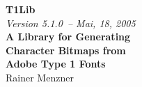 \documentclass[11pt,a4paper]{article}
\def\libversion{5.1.0}\relax
\def\libdate{Mai, 18, 2005}\relax
\begin{document}
\thispagestyle{empty}
\begin{center}
\leavevmode
\vskip2cm
{\Huge\bfseries T1Lib}\\[5mm]

{\Large\sl Version \libversion\ --  \libdate}\\[2.5cm]

{\LARGE\bf A Library for Generating}\\[5mm]
{\LARGE\bf Character Bitmaps from}\\[5mm]
{\LARGE\bf Adobe Type 1 Fonts}\\[2cm]
{\Large\sc Rainer Menzner}\\[2mm]
\end{center}
\newpage
\tableofcontents







\def\indexname{Function Index\addcontentsline{toc}{section}{\hskip1emFunction Index}}%
\printindex
\end{document}
